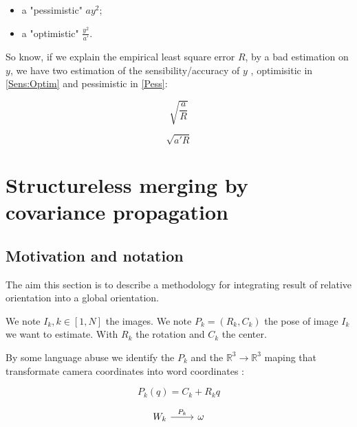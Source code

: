 \begin{itemize}
   \item a "pessimistic" $a y^2$;
   \item a "optimistic" $\frac{y^2}{a'}$.
\end{itemize}

So know, if we explain the empirical least square error $R$, by
a bad estimation on $y$, we have two estimation of the sensibility/accuracy of $y$ ,
optimisitic in \ref{Sens:Optim} and pessimistic in \ref{Pess}:

\begin{equation}
  \sqrt{\frac{a}{R}}
  \label{Sens:Optim}
\end{equation}


\begin{equation}
  \sqrt{a'R}
  \label{Sens:Pess}
\end{equation}


\section{Structureless merging by covariance propagation}

\subsection{Motivation and notation}

The aim this section is to describe a methodology for integrating
result of relative orientation into a global orientation.

We note  $I_k, k \in [1,N] $ the images.
We note  $P_k = (R_k , C_k) $ the pose of image $I_k$ we want to estimate.
With $R_k$ the rotation and $C_k$ the center.

By some language abuse we identify the $P_k$ and the $\mathbb{R}^3 \to  \mathbb{R}^3$ maping
that transformate camera coordinates into word coordinates :

\begin{equation}
   P_k(q) = C_k + R_k q
\end{equation}


\begin{equation}
\begin{tikzcd}
   W_k \arrow[r, "P_k"] &  \omega
\end{tikzcd}
\end{equation}

